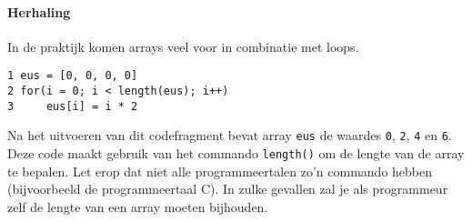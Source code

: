 \paragraph{Herhaling}

In de praktijk komen arrays veel voor in combinatie met loops.

\begin{verbatim}
1 eus = [0, 0, 0, 0]
2 for(i = 0; i < length(eus); i++)
3     eus[i] = i * 2
\end{verbatim}

Na het uitvoeren van dit codefragment bevat array \texttt{eus} de waardes \texttt{0}, \texttt{2}, \texttt{4} en \texttt{6}. Deze code maakt gebruik van het commando \texttt{length()} om de lengte van de array te bepalen. Let erop dat niet alle programmeertalen zo'n commando hebben (bijvoorbeeld de programmeertaal C). In zulke gevallen zal je als programmeur zelf de lengte van een array moeten bijhouden.
